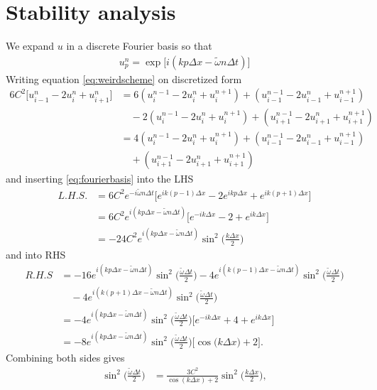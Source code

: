 \documentclass[a4paper,10pt]{article}
\renewcommand{\(}{\left(}
\renewcommand{\)}{\right)}
\begin{document}
\section*{Stability analysis}
We expand $u$ in a discrete Fourier basis so that
\begin{align}
  \label{eq:fourierbasis}
  u_p^n = \exp\Big[i(kp\Delta x - \tilde \omega n\Delta t)\Big]
\end{align}
Writing equation \eqref{eq:weirdscheme} on discretized form
\begin{align*}
  6C^2\Big[u_{i-1}^n - 2u_i^n + u_{i+1}^n\Big] &=
  6(u_i^{n-1} - 2u_i^n + u_i^{n+1})
   + (
  u_{i-1}^{n-1} - 2u_{i-1}^n + u_{i-1}^{n+1})\\
  &\quad-2(
  u_i^{n-1} - 2u_i^n +u_i^{n+1})
  + (
  u_{i+1}^{n-1} - 2u_{i+1}^n + u_{i+1}^{n+1})\\
  &= 4(u_i^{n-1} - 2u_i^n + u_i^{n+1})
   + (
  u_{i-1}^{n-1} - 2u_{i-1}^n + u_{i-1}^{n+1})\\
  &\quad + (
  u_{i+1}^{n-1} - 2u_{i+1}^n + u_{i+1}^{n+1})
\end{align*}
and inserting \eqref{eq:fourierbasis} into the LHS
\begin{align*}
  L.H.S. &=6C^2e^{-i\tilde\omega n \Delta t}\Big[e^{ik(p-1)\Delta x} -2e^{ikp\Delta x} + e^{ik(p+1)\Delta x}\Big]\\
  &=6C^2e^{i(kp\Delta x - \tilde\omega n \Delta t)}\Big[e^{-ik\Delta x} - 2 + e^{ik\Delta x}\Big]\\
  &=-24C^2e^{i(kp\Delta x - \tilde\omega n \Delta t)}\sin^2\Big(\frac{k\Delta x}{2}\Big)
\end{align*}
and into RHS
\begin{align*}
  R.H.S &= -16e^{i(kp\Delta x - \tilde\omega n \Delta t)}\sin^2\Big(\frac{\tilde \omega\Delta t}{2}\Big) -4e^{i(k(p-1)\Delta x - \tilde\omega n \Delta t)}\sin^2\Big(\frac{\tilde \omega\Delta t}{2}\Big)\\
  &\quad -4e^{i(k(p+1)\Delta x - \tilde\omega n \Delta t)}\sin^2\Big(\frac{\tilde \omega\Delta t}{2}\Big)\\
  &=-4e^{i(kp\Delta x - \tilde\omega n \Delta t)}\sin^2\Big(\frac{\tilde\omega\Delta t}{2}\Big)\Big[e^{-ik\Delta x} + 4 + e^{ik\Delta x}\Big]\\
  &=-8e^{i(kp\Delta x - \tilde\omega n \Delta t)}\sin^2\Big(\frac{\tilde\omega\Delta t}{2}\Big)\Big[\cos\Big(k\Delta x\Big) + 2\Big].
\end{align*}
Combining both sides gives
\begin{align*}
  \sin^2\Big(\frac{\tilde\omega\Delta t}{2}\Big) &= \frac{3C^2}{\cos(k\Delta x) + 2}\sin^2\Big(\frac{k\Delta x}{2}\Big),
\end{align*}
\end{document}
